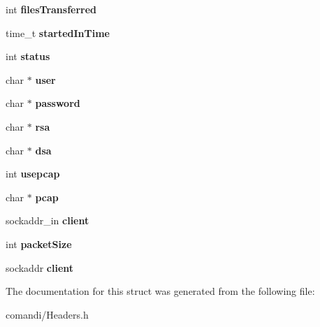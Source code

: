 \begin{DoxyCompactItemize}
\item 
int {\bfseries files\+Transferred}\hypertarget{struct____attribute_____a1b6abbcd74a6b89dabf679b2460b90ac}{}\label{struct____attribute_____a1b6abbcd74a6b89dabf679b2460b90ac}

\item 
time\+\_\+t {\bfseries started\+In\+Time}\hypertarget{struct____attribute_____ac3b6c3e36f5c609acf7c77a1eb921c9d}{}\label{struct____attribute_____ac3b6c3e36f5c609acf7c77a1eb921c9d}

\item 
int {\bfseries status}\hypertarget{struct____attribute_____a125027509765b665b98fed8d9de0848d}{}\label{struct____attribute_____a125027509765b665b98fed8d9de0848d}

\item 
char $\ast$ {\bfseries user}\hypertarget{struct____attribute_____a563a49366d8db439fad10a4400c3e9d2}{}\label{struct____attribute_____a563a49366d8db439fad10a4400c3e9d2}

\item 
char $\ast$ {\bfseries password}\hypertarget{struct____attribute_____a244f803edc2486294e7cd836174b50ce}{}\label{struct____attribute_____a244f803edc2486294e7cd836174b50ce}

\item 
char $\ast$ {\bfseries rsa}\hypertarget{struct____attribute_____aa3707a3beb1a96f1dc33cccdf96d15f2}{}\label{struct____attribute_____aa3707a3beb1a96f1dc33cccdf96d15f2}

\item 
char $\ast$ {\bfseries dsa}\hypertarget{struct____attribute_____aeac71771c3b85fd9f40150914b5892be}{}\label{struct____attribute_____aeac71771c3b85fd9f40150914b5892be}

\item 
int {\bfseries usepcap}\hypertarget{struct____attribute_____a6fccd4e2bb45a0ed006c9a737d8d687d}{}\label{struct____attribute_____a6fccd4e2bb45a0ed006c9a737d8d687d}

\item 
char $\ast$ {\bfseries pcap}\hypertarget{struct____attribute_____a3717a2fe0dc676aeb81cd32c164645ca}{}\label{struct____attribute_____a3717a2fe0dc676aeb81cd32c164645ca}

\item 
sockaddr\+\_\+in {\bfseries client}\hypertarget{struct____attribute_____afabec15aed5649280f8cf65ef240d127}{}\label{struct____attribute_____afabec15aed5649280f8cf65ef240d127}

\item 
int {\bfseries packet\+Size}\hypertarget{struct____attribute_____a5822e88883d412e742f6a0144396abee}{}\label{struct____attribute_____a5822e88883d412e742f6a0144396abee}

\item 
sockaddr {\bfseries client}\hypertarget{struct____attribute_____a3cd038f5d9346f45361d2ca531557760}{}\label{struct____attribute_____a3cd038f5d9346f45361d2ca531557760}

\end{DoxyCompactItemize}


The documentation for this struct was generated from the following file\+:\begin{DoxyCompactItemize}
\item 
comandi/Headers.\+h\end{DoxyCompactItemize}
